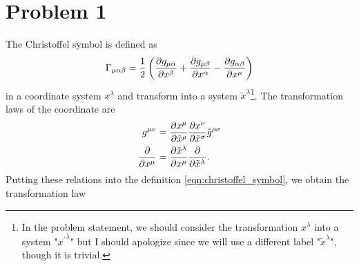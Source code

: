 \documentclass[a4paper,pdftex,10pt]{article}
\begin{document}
\maketitle

\tableofcontents

\clearpage
\section{Problem 1}

The Christoffel symbol is defined as
\begin{equation}
  \Gamma_{\mu\alpha\beta}
  =
  \frac{1}{2}
  \left(
  \pdv{g_{\mu\alpha}}{x^{\beta}}
  +
  \pdv{g_{\mu\beta}}{x^{\alpha}}
  -
  \pdv{g_{\alpha\beta}}{x^{\mu}}
  \right)
  \label{eqn:christoffel_symbol}
\end{equation}
in a coordinate system $x^{\lambda}$ and transform into a system $\tilde{x}^{\lambda}$\footnote{
  In the problem statement, we should consider the transformation $x^{\lambda}$ into a system "${x^{\prime}}^{\lambda}$" but I should apologize since we will use a different label "$\tilde{x}^{\lambda}$", though it is trivial.
}. The transformation laws of the coordinate are
\begin{align}
  g^{\mu\nu}
   & =
  \pdv{x^{\mu}}{\tilde{x}^{\rho}}\pdv{x^{\nu}}{\tilde{x}^{\sigma}}\tilde{g}^{\rho\sigma}
  \\
  \pdv{}{x^{\mu}}
   & =
  \pdv{\tilde{x}^{\lambda}}{x^{\mu}}\pdv{}{\tilde{x}^{\lambda}}  .
\end{align}
Putting these relations into the definition \eqref{eqn:christoffel_symbol}, we obtain the transformation law
\end{document}

